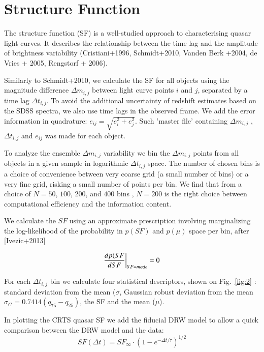 \documentclass[fleqn,usenatbib]{mnras}  %
\begin{document}
\section{Structure Function}

The structure function (SF) is a well-studied approach to characterising quasar light curves. It describes the relationship between the time lag and the amplitude of brightness variability (Cristiani+1996, Schmidt+2010, Vanden Berk +2004, de Vries + 2005, Rengstorf + 2006). 

 Similarly to Schmidt+2010, we  calculate the SF for all objects  using  the magnitude difference $\Delta m _{i,j}$ between light curve points $i$ and $j$, separated by a time lag $\Delta t_{i,j}$. To avoid the additional uncertainty of redshift estimates based on the SDSS spectra, we also use time lags in the observed frame. We add the error information in quadrature: $e_{ij} = \sqrt{e_{i}^{2}+e_{j}^{2}}$. Such 'master file' containing  $\Delta m _{i,j}$ , 
$\Delta t_{i,j}$ and $e_{ij} $ was made for each object. 

To analyze the ensemble $\Delta m _{i,j}$  variability  we bin the $\Delta m _{i,j}$ points from all objects in a given sample  in logarithmic $\Delta t_{i,j}$  space. The number of chosen bins is a choice of convenience between very coarse grid (a small number of bins) or a very fine grid, risking a small number of points per bin. We find that from  a choice of $N=$$50$, $100$, $200$, and $400$ bins ,  $N=200$ is the right choice between computational efficiency and the information content. 

We calculate the $SF$ using an approximate prescription involving marginalizing the log-likelihood of the probability in $p(SF)$ and $p(\mu)$ space per bin, after [Ivezic+2013]
 
\begin{equation}
\centering
\frac{d p(SF}{d SF } \bigg| _{SF = mode} = 0
\end{equation}

For each $\Delta t_{i,j}$  bin we calculate four statistical descriptors, shown on Fig.~\ref{fig:2} :  standard deviation from the mean ($\sigma$, Gaussian robust deviation from the mean $\sigma_{G}=0.7414 (q_{75}-q_{25})$,  the SF and the mean ($\mu$).  

In plotting the CRTS quasar SF we  add the  fiducial DRW  model to allow a quick comparison between the DRW model and the data:
\begin{equation}
SF(\Delta t) = SF_{\infty} \cdot \left( 1-e^{-\Delta t / \tau} \right) ^ {1/2}
\end{equation}
\end{document}
